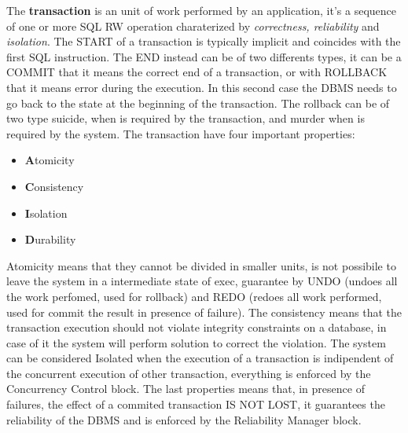 \documentclass[12pt]{article}
\begin{document}
The \textbf{transaction} is an unit of work performed by an application, it's a sequence of one or more SQL RW operation charaterized by \textit{correctness, reliability} and \textit{isolation}. The START of a transaction is typically implicit and coincides with the first SQL instruction. The END instead can be of two differents types, it can be a COMMIT that it means the correct end of a transaction, or with ROLLBACK that it means error during the execution. In this second case the DBMS needs to go back to the state at the beginning of the transaction. The rollback can be of two type suicide, when is required by the transaction, and murder when is required by the system. The transaction have four important properties:
\begin{itemize}
  \item \textbf{A}tomicity
  \item \textbf{C}onsistency
  \item \textbf{I}solation
  \item \textbf{D}urability
\end{itemize}
Atomicity means that they cannot be divided in smaller units, is not possibile to leave the system in a intermediate state of exec, guarantee by UNDO (undoes all the work perfomed, used for rollback) and REDO (redoes all work performed, used for commit the result in presence of failure). The consistency means that the transaction execution should not violate integrity constraints on a database, in case of it the system will perform solution to correct the violation. The system can be considered Isolated when the execution of a transaction is indipendent of the concurrent execution of other transaction, everything is enforced by the Concurrency Control block. The last properties means that, in presence of failures, the effect of a commited transaction IS NOT LOST, it guarantees the reliability of the DBMS and is enforced by the Reliability Manager block. %
\end{document}
